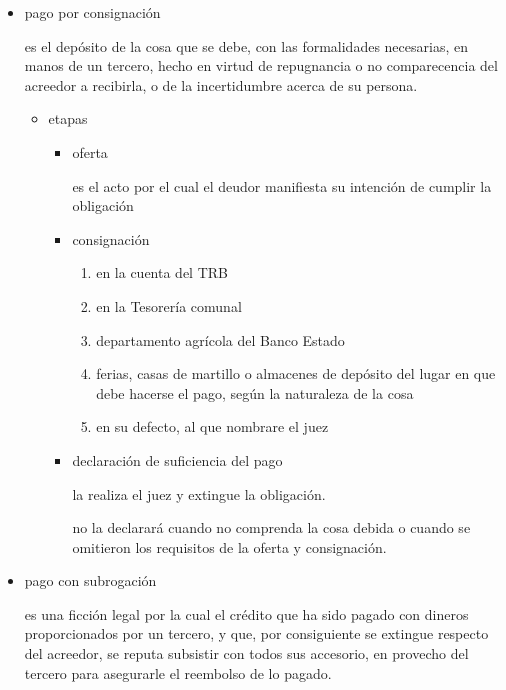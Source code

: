 \documentclass[]{article}
\providecommand{\tightlist}{%
  \setlength{\itemsep}{0pt}\setlength{\parskip}{0pt}}
\begin{document}
\begin{itemize}
\begin{itemize}
\begin{itemize}
      \begin{itemize}
      \item
        pago por consignación

        es el depósito de la cosa que se debe, con las formalidades
        necesarias, en manos de un tercero, hecho en virtud de
        repugnancia o no comparecencia del acreedor a recibirla, o de la
        incertidumbre acerca de su persona.

        \begin{itemize}
        \tightlist
        \item
          etapas

          \begin{itemize}
          \item
            oferta

            es el acto por el cual el deudor manifiesta su intención de
            cumplir la obligación
          \item
            consignación

            \begin{enumerate}
            \def\labelenumi{\arabic{enumi}.}
            \tightlist
            \item
              en la cuenta del TRB
            \item
              en la Tesorería comunal
            \item
              departamento agrícola del Banco Estado
            \item
              ferias, casas de martillo o almacenes de depósito del
              lugar en que debe hacerse el pago, según la naturaleza de
              la cosa
            \item
              en su defecto, al que nombrare el juez
            \end{enumerate}
          \item
            declaración de suficiencia del pago

            la realiza el juez y extingue la obligación.

            no la declarará cuando no comprenda la cosa debida o cuando
            se omitieron los requisitos de la oferta y consignación.
          \end{itemize}
        \end{itemize}
      \item
        pago con subrogación

        es una ficción legal por la cual el crédito que ha sido pagado
        con dineros proporcionados por un tercero, y que, por
        consiguiente se extingue respecto del acreedor, se reputa
        subsistir con todos sus accesorio, en provecho del tercero para
        asegurarle el reembolso de lo pagado.


\end{itemize}
\end{itemize}
\end{itemize}
\end{itemize}
\end{document}
